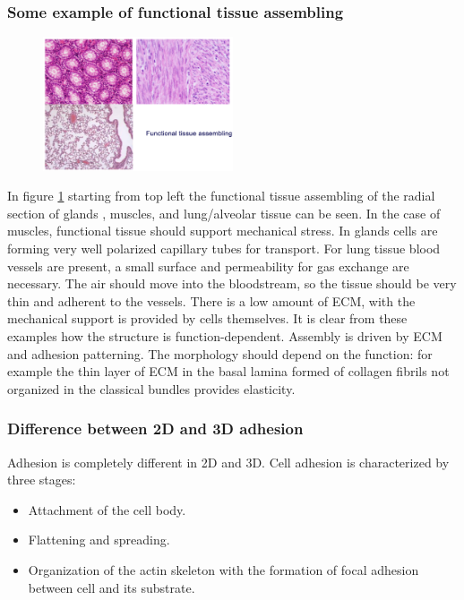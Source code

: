 		\subsubsection{Some example of functional tissue assembling}

		\begin{figure}[h]
		\centering
		\includegraphics[width=0.5\textwidth]{functionaltissue}
		\caption{\label{fig:funtis}}
		\end{figure}

		In figure \ref{fig:funtis} starting from top left the functional tissue assembling of the radial section of glands , muscles, and lung/alveolar tissue can be seen.
		In the case of muscles, functional tissue should support mechanical stress.
		In glands cells are forming very well polarized capillary tubes for transport.
		For lung tissue blood vessels are present, a small surface and permeability for gas exchange are necessary.
		The air should move into the bloodstream, so the tissue should be very thin and adherent to the vessels.
		There is a low amount of ECM, with the mechanical support is provided by cells themselves.
		It is clear from these examples how the structure is function-dependent.
		Assembly is driven by ECM and adhesion patterning.
		The morphology should depend on the function: for example the thin layer of ECM in the basal lamina formed of collagen fibrils not organized in the classical bundles provides elasticity.

		\subsubsection{Difference between 2D and 3D adhesion}
		Adhesion is completely different in 2D and 3D.
		Cell adhesion is characterized by three stages:

		\begin{multicols}{2}
			\begin{itemize}
				\item Attachment of the cell body.
				\item Flattening and spreading.
				\item Organization of the actin skeleton with the formation of focal adhesion between cell and its substrate.
			\end{itemize}
		\end{multicols}

